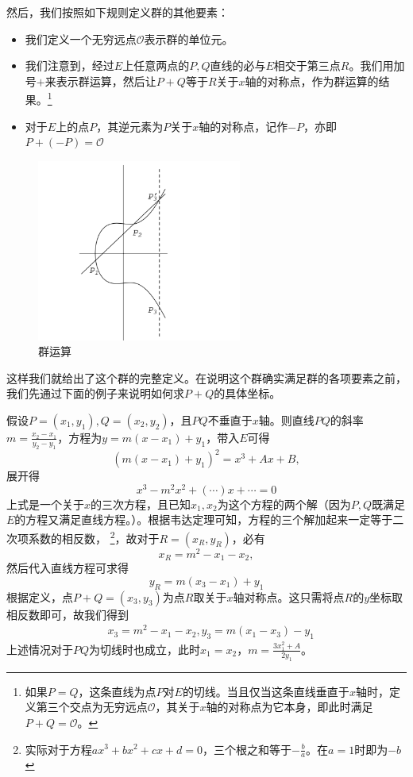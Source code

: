\documentclass[12pt]{article}
\newcommand{\oo}{\mathcal{O}}
\begin{document}
然后，我们按照如下规则定义群的其他要素：
\begin{itemize}
	\item 我们定义一个无穷远点$\mathcal{O}$表示群的单位元。
	\item 我们注意到，经过$E$上任意两点的$P,Q$直线的必与$E$相交于第三点$R$。我们用加号$+$来表示群运算，然后让$P+Q$等于$R$关于$x$轴的对称点，作为群运算的结果。\footnote{如果$P=Q$，这条直线为点$P$对$E$的切线。当且仅当这条直线垂直于$x$轴时，定义第三个交点为无穷远点$\oo$，其关于$x$轴的对称点为它本身，即此时满足$P+Q=\oo$。}
	\item 对于$E$上的点$P$，其逆元素为$P$关于$x$轴的对称点，记作$-P$，亦即$P+(-P)=\mathcal{O}$
\end{itemize}
\begin{figure}[H]
	\centering
	\label{fig:grouplaw}
	\includegraphics[width=0.6\textwidth]{../common/grouplaw.png}
	\caption{群运算}
\end{figure}
这样我们就给出了这个群的完整定义。在说明这个群确实满足群的各项要素之前，我们先通过下面的例子来说明如何求$P+Q$的具体坐标。

假设$P=(x_1,y_1),Q=(x_2,y_2)$，且$PQ$不垂直于$x$轴。则直线$PQ$的斜率$m=\frac{x_2-x_1}{y_2-y_1}$，方程为$y=m(x-x_1)+y_1$，带入$E$可得
$$(m(x-x_1)+y_1)^2=x^3+Ax+B,$$
展开得
$$x^3-m^2x^2+(\cdots)x+\cdots=0$$
上式是一个关于$x$的三次方程，且已知$x_1,x_2$为这个方程的两个解（因为$P,Q$既满足$E$的方程又满足直线方程。）。根据韦达定理可知，方程的三个解加起来一定等于二次项系数的相反数， \footnote{实际对于方程$ax^3+bx^2+cx+d=0$，三个根之和等于$-\frac{b}{a}$。在$a=1$时即为$-b$}，故对于$R=(x_R,y_R)$，必有
$$x_R=m^2-x_1-x_2,$$
然后代入直线方程可求得
$$y_R=m(x_3-x_1)+y_1$$
根据定义，点$P+Q=(x_3,y_3)$为点$R$取关于$x$轴对称点。这只需将点$R$的$y$坐标取相反数即可，故我们得到
\begin{align}
\label{groupop}
& x_3 = m^2-x_1-x_2, y_3 = m(x_1-x_3)-y_1
\end{align}
上述情况对于$PQ$为切线时也成立，此时$x_1=x_2$，$m=\frac{3x_1^2+A}{2y_1}$。
\end{document}
